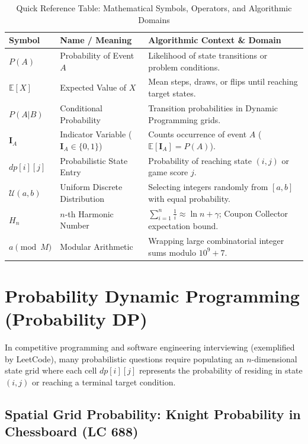\documentclass[10pt,journal,compsoc,onecolumn]{IEEEtran}
\begin{document}
\begin{table}[htbp]
\centering
\caption{Quick Reference Table: Mathematical Symbols, Operators, and Algorithmic Domains}
\label{tab:math-symbols}
\begin{tabular}{lll}
\toprule
\textbf{Symbol} & \textbf{Name / Meaning} & \textbf{Algorithmic Context \& Domain} \\
\midrule
$P(A)$ & Probability of Event $A$ & Likelihood of state transitions or problem conditions. \\
$\mathbb{E}[X]$ & Expected Value of $X$ & Mean steps, draws, or flips until reaching target states. \\
$P(A|B)$ & Conditional Probability & Transition probabilities in Dynamic Programming grids. \\
$\mathbf{I}_A$ & Indicator Variable ($\mathbf{I}_A \in \{0,1\}$) & Counts occurrence of event $A$ ($\mathbb{E}[\mathbf{I}_A] = P(A)$). \\
$dp[i][j]$ & Probabilistic State Entry & Probability of reaching state $(i,j)$ or game score $j$. \\
$\mathcal{U}(a, b)$ & Uniform Discrete Distribution & Selecting integers randomly from $[a, b]$ with equal probability. \\
$H_n$ & $n$-th Harmonic Number & $\sum_{i=1}^n \frac{1}{i} \approx \ln n + \gamma$; Coupon Collector expectation bound. \\
$a \pmod M$ & Modular Arithmetic & Wrapping large combinatorial integer sums modulo $10^9+7$. \\
\bottomrule
\end{tabular}
\end{table}

\section{Probability Dynamic Programming (Probability DP)}
\label{sec:probabilistic-dp}

In competitive programming and software engineering interviewing (exemplified by LeetCode), many probabilistic questions require populating an $n$-dimensional state grid where each cell $dp[i][j]$ represents the probability of residing in state $(i,j)$ or reaching a terminal target condition.

\subsection{Spatial Grid Probability: Knight Probability in Chessboard (LC 688)}
\end{document}
